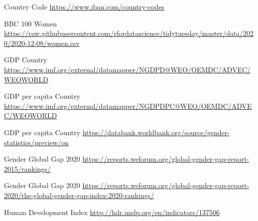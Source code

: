 \documentclass[11pt, a4paper]{report}
\begin{document}
	
	
	
	
	
	
	
	
	
\newpage


\begin{thebibliography}{100}
	
Country Code
\url{https://www.iban.com/country-codes}

BBC 100 Women
\url{https://raw.githubusercontent.com/rfordatascience/tidytuesday/master/data/2020/2020-12-08/women.csv}

GDP Country
\url{https://www.imf.org/external/datamapper/NGDPD@WEO/OEMDC/ADVEC/WEOWORLD}

GDP per capita Country
\url{https://www.imf.org/external/datamapper/NGDPDPC@WEO/OEMDC/ADVEC/WEOWORLD}

GDP per capita Country
\url{https://databank.worldbank.org/source/gender-statistics/preview/on}

Gender Global Gap 2020
\url{https://reports.weforum.org/global-gender-gap-report-2015/rankings/}

Gender Global Gap 2020
\url{https://reports.weforum.org/global-gender-gap-report-2020/the-global-gender-gap-index-2020-rankings/}

Human Development Index
\url{http://hdr.undp.org/en/indicators/137506}	
	
	
	
	
\end{thebibliography}


	
	
\end{document}
